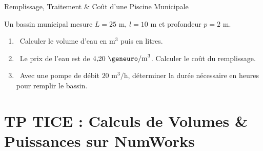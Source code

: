 \begin{exercice}[4 pts][\capRealiser]{Remplissage, Traitement \& Coût d'une Piscine Municipale}
\noindent
\begin{minipage}[c]{0.58\linewidth}
Un bassin municipal mesure $L = 25\text{ m}$, $l = 10\text{ m}$ et profondeur $p = 2\text{ m}$.
\begin{enumerate}[leftmargin=1.2em, itemsep=1pt]
    \item \capRealiser\ Calculer le volume d'eau en $\text{m}^3$ puis en litres.
    \item \capRealiser\ Le prix de l'eau est de $4{,}20\text{ \euro/m}^3$. Calculer le coût du remplissage.
    \item \capValider\ Avec une pompe de débit $20\text{ m}^3/\text{h}$, déterminer la durée nécessaire en heures pour remplir le bassin.
\end{enumerate}
\end{minipage}\hfill
\begin{minipage}[c]{0.38\linewidth}
\centering
{}
\end{minipage}

\vspace{1mm}
\lignesreponse[2]
\end{exercice}

\section{TP TICE : Calculs de Volumes \& Puissances sur NumWorks}

